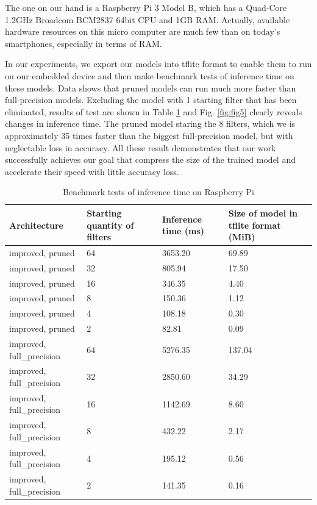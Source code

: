 \documentclass[sigconf]{acmart}
\begin{document}
The one on our hand is a Raspberry Pi 3 Model B, which has a Quad-Core 1.2GHz Broadcom BCM2837 64bit CPU and 1GB RAM. Actually, available hardware resources on this micro computer are much few than on today's smartphones, especially in terms of RAM. 

In our experiments, we export our models into tflite format to enable them to run on our embedded device and then make benchmark tests of inference time on these models. Data shows that pruned models can run much more faster than full-precision models. Excluding the model with 1 starting filter that has been eliminated, results of test are shown in Table \ref{tab:table5} and Fig. \ref{fig:fig5} clearly reveals changes in inference time. The pruned model staring the 8 filters, which we  is approximately 35 times faster than the biggest full-precision model, but with neglectable loss in accuracy. All these result demonstrates that our work successfully achieves our goal that compress the size of the trained model and accelerate their speed with little accuracy loss.

\begin{table}
 \caption{Benchmark tests of inference time on Raspberry Pi}
  \centering
  \begin{tabular}{llll}
    \toprule
    Architecture & Starting quantity of filters & Inference time (ms)  & Size of model in tflite format (MiB) \\
    \midrule
    improved, pruned & 64 & 3653.20 & 69.89 \\
    \midrule
    improved, pruned & 32 & 805.94 & 17.50 \\
    \midrule
    improved, pruned & 16 & 346.35 & 4.40 \\
    \midrule
    improved, pruned &  8 & 150.36 & 1.12 \\
    \midrule
    improved, pruned &  4 & 108.18 & 0.30 \\
    \midrule
    improved, pruned &  2 & 82.81 & 0.09 \\
    \midrule
    improved, full\_precision & 64 & 5276.35 & 137.04 \\
    \midrule
    improved, full\_precision & 32 & 2850.60 & 34.29 \\
    \midrule
    improved, full\_precision & 16 & 1142.69 & 8.60 \\
    \midrule
    improved, full\_precision &  8 & 432.22 & 2.17 \\
    \midrule
    improved, full\_precision &  4 & 195.12 & 0.56 \\
    \midrule
    improved, full\_precision &  2 & 141.35 & 0.16 \\
    \bottomrule
  \end{tabular}
  \label{tab:table5}
\end{table}
\end{document}
